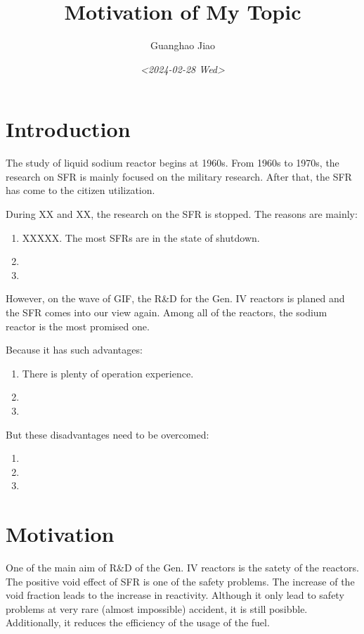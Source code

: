 \documentclass[11pt]{article}
\author{Guanghao Jiao}
\date{\textit{<2024-02-28 Wed>}}
\title{Motivation of My Topic}
\begin{document}
\maketitle
\section{Introduction}
\label{sec:org9fb3e00}
The study of liquid sodium reactor begins at 1960s. From 1960s to 1970s, the research on SFR is mainly focused on the military research. After that, the SFR has come to the citizen utilization.

During XX and XX, the research on the SFR is stopped.
The reasons are mainly:
\begin{enumerate}
\item XXXXX. The most SFRs are in the state of shutdown.
\item 

\item 
\end{enumerate}

However, on the wave of GIF, the R\&D for the Gen. IV reactors is planed and the SFR comes into our view again. Among all of the reactors, the sodium reactor is the most promised one.

Because it has such advantages:
\begin{enumerate}
\item There is plenty of operation experience.
\item 

\item 
\end{enumerate}

But these disadvantages need to be overcomed:
\begin{enumerate}
\item 

\item 

\item 
\end{enumerate}

\section{Motivation}
\label{sec:orgbd7481f}
One of the main aim of R\&D of the Gen. IV reactors is the satety of the reactors. The positive void effect of SFR is one of the safety problems. The increase of the void fraction leads to the increase in reactivity. Although it only lead to safety problems at very rare (almost impossible) accident, it is still posibble. Additionally, it reduces the efficiency of the usage of the fuel.
\end{document}
